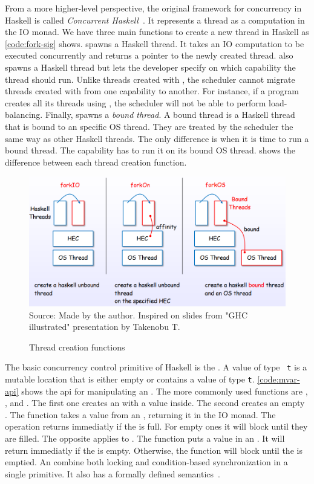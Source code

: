 From a more higher-level perspective, the original framework for concurrency in Haskell is called \emph{Concurrent Haskell}~\citep{smpj:1996}. It represents a thread as a computation in the IO monad. We have three main functions to create a new thread in Haskell as \autoref{code:fork-sig} shows. \forkIO spawns a Haskell thread. It takes an IO computation to be executed concurrently and returns a pointer to the newly created thread. \forkOn also spawns a Haskell thread but lets the developer specify on which capability the thread should run. Unlike threads created with \forkIO, the scheduler cannot migrate threads created with \forkOn from one capability to another. For instance, if a program creates all its threads using \forkOn, the scheduler will not be able to perform load-balancing. Finally, \forkOS spawns a \emph{bound thread}. A bound thread is a Haskell thread that is bound to an specific OS thread. They are treated by the scheduler the same way as other Haskell threads. The only difference is when it is time to run a bound thread. The capability has to run it on its bound OS thread.  shows the difference between each thread creation function.

\begin{figure}[htp]
  \centering
  \caption{Thread creation functions}
  \includegraphics[width=\columnwidth]{images/haskell-threads-placeholder}
  \footnotesize{Source: Made by the author. Inspired on slides from "GHC illustrated" presentation by Takenobu T.}
  \label{fig:haskell-threads}
\end{figure}

The basic concurrency control primitive of Haskell is the \MVar. A value of type \MVar~\texttt{t} is a mutable location that is either empty or contains a value of type \texttt{t}. \autoref{code:mvar-api} shows the \ac{api} for manipulating an \MVar. The more commonly used functions are \newMVar, \newEmptyMVar, \takeMVar and \putMVar. The first one creates an \MVar with a value inside. The second creates an empty \MVar. The \takeMVar function takes a value from an \MVar, returning it in the IO monad. The operation returns immediatly if the \MVar is full. For empty ones it will block until they are filled. The opposite applies to \putMVar. The function puts a value in an \MVar. It will return immediatly if the \MVar is empty. Otherwise, the function will block until the \MVar is emptied. An \MVar combine both locking and condition-based synchronization in a single primitive. It also has a formally defined semantics~\citep{smpj:1996}.

